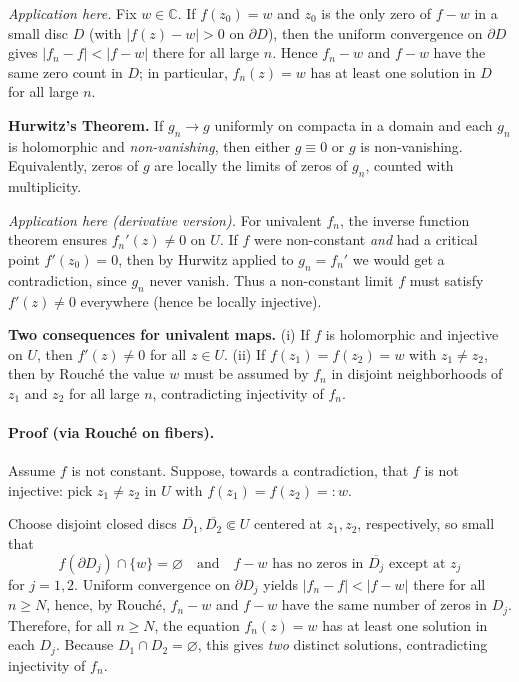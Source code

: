 \documentclass[12pt,a4paper]{article}
\begin{document}
\emph{Application here.}
Fix $w\in\mathbb C$. If $f(z_0)=w$ and $z_0$ is the only zero of $f-w$ in a small disc $D$
(with $|f(z)-w|>0$ on $\partial D$), then the uniform convergence on $\partial D$ gives
$|f_n-f|<|f-w|$ there for all large $n$.
Hence $f_n-w$ and $f-w$ have the same zero count in $D$; in particular, $f_n(z)=w$
has at least one solution in $D$ for all large $n$.

\medskip

\textbf{Hurwitz's Theorem.}
If $g_n\to g$ uniformly on compacta in a domain and each $g_n$ is holomorphic
and \emph{non-vanishing}, then either $g\equiv 0$ or $g$ is non-vanishing.
Equivalently, zeros of $g$ are locally the limits of zeros of $g_n$, counted with multiplicity.

\emph{Application here (derivative version).}
For univalent $f_n$, the inverse function theorem ensures $f_n'(z)\neq 0$ on $U$.
If $f$ were non-constant \emph{and} had a critical point $f'(z_0)=0$, then by Hurwitz
applied to $g_n=f_n'$ we would get a contradiction, since $g_n$ never vanish.
Thus a non-constant limit $f$ must satisfy $f'(z)\neq 0$ everywhere (hence be locally injective).

\medskip

\textbf{Two consequences for univalent maps.}
(i) If $f$ is holomorphic and injective on $U$, then $f'(z)\neq 0$ for all $z\in U$.
(ii) If $f(z_1)=f(z_2)=w$ with $z_1\neq z_2$, then by Rouch\'e the value $w$ must be
assumed by $f_n$ in disjoint neighborhoods of $z_1$ and $z_2$ for all large $n$,
contradicting injectivity of $f_n$.

\bigskip

\paragraph{Proof (via Rouch\'e on fibers).}
Assume $f$ is not constant.
Suppose, towards a contradiction, that $f$ is not injective: pick
$z_1\neq z_2$ in $U$ with $f(z_1)=f(z_2)=:w$.

Choose disjoint closed discs $\overline{D_1},\overline{D_2}\Subset U$ centered at
$z_1,z_2$, respectively, so small that
\[
f(\partial D_j)\cap\{w\}=\varnothing
\quad\text{and}\quad
\text{$f-w$ has no zeros in $\overline{D_j}$ except at $z_j$}
\]
for $j=1,2$.
Uniform convergence on $\partial D_j$ yields $|f_n-f|<|f-w|$ there for all $n\ge N$,
hence, by Rouch\'e, $f_n-w$ and $f-w$ have the same number of zeros in $D_j$.
Therefore, for all $n\ge N$, the equation $f_n(z)=w$ has at least one solution in each $D_j$.
Because $D_1\cap D_2=\varnothing$, this gives \emph{two} distinct solutions,
contradicting injectivity of $f_n$.
\end{document}
